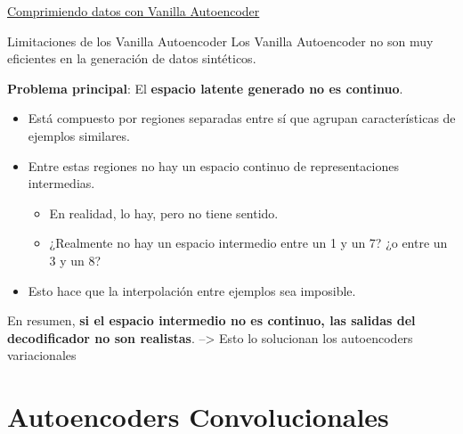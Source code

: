 \begin{exercise}
\href{https://colab.research.google.com/drive/1-YAytBp9L5nkHvAxKV7urjaeE6HH58Dj}{Comprimiendo datos con Vanilla Autoencoder}

\end{exercise}

\begin{frame}{Limitaciones de los Vanilla Autoencoder}
Los Vanilla Autoencoder no son muy eficientes en la generación de datos sintéticos.

\textbf{Problema principal}: El \textbf{espacio latente generado no es continuo}.

\begin{itemize}
    \item Está compuesto por regiones separadas entre sí que agrupan características de ejemplos similares.
    \item Entre estas regiones no hay un espacio continuo de representaciones intermedias.
    \begin{itemize}
        \item En realidad, lo hay, pero no tiene sentido.
        \item ¿Realmente no hay un espacio intermedio entre un 1 y un 7? ¿o entre un 3 y un 8?
    \end{itemize}
    \item Esto hace que la interpolación entre ejemplos sea imposible.
\end{itemize}

En resumen, \textbf{si el espacio intermedio no es continuo, las salidas del decodificador no son realistas}. --> Esto lo solucionan los autoencoders variacionales
\end{frame}


\section{Autoencoders Convolucionales}

